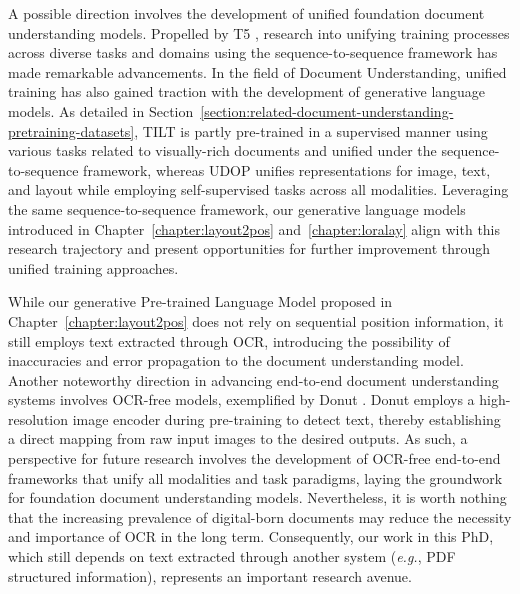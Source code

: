 
A possible direction involves the development of unified foundation document understanding models. Propelled by \ac{T5} \citep{raffel2020exploring}, research into unifying training processes across diverse tasks and domains using the sequence-to-sequence framework has made remarkable advancements. In the field of Document Understanding, unified training has also gained traction with the development of generative language models. As detailed in Section~\ref{section:related-document-understanding-pretraining-datasets}, TILT \citep{powalski2021going} is partly pre-trained in a supervised manner using various tasks related to visually-rich documents and unified under the sequence-to-sequence framework, whereas UDOP \citep{tang2023unifying} unifies representations for image, text, and layout while employing self-supervised tasks across all modalities. Leveraging the same sequence-to-sequence framework, our generative language models introduced in Chapter~\ref{chapter:layout2pos} and~\ref{chapter:loralay} align with this research trajectory and present opportunities for further improvement through unified training approaches.

While our generative Pre-trained Language Model proposed in Chapter~\ref{chapter:layout2pos} does not rely on sequential position information, it still employs text extracted through \ac{OCR}, introducing the possibility of inaccuracies and error propagation to the document understanding model. Another noteworthy direction in advancing end-to-end document understanding systems involves \ac{OCR}-free models, exemplified by Donut \citep{kim2022ocr}. Donut employs a high-resolution image encoder during pre-training to detect text, thereby establishing a direct mapping from raw input images to the desired outputs. As such, a perspective for future research involves the development of \ac{OCR}-free end-to-end frameworks that unify all modalities and task paradigms, laying the groundwork for foundation document understanding models. Nevertheless, it is worth nothing that the increasing prevalence of digital-born documents may reduce the necessity and importance of \ac{OCR} in the long term. Consequently, our work in this PhD, which still depends on text extracted through another system (\textit{e.g.}, PDF structured information), represents an important research avenue.

